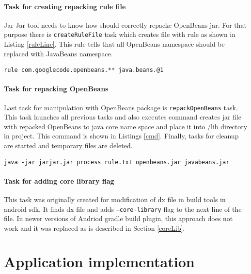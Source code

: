 \paragraph{Task for creating repacking rule file}  Jar Jar tool needs to know how should correctly repacke OpenBeans jar.
For that purpose there is \texttt{createRuleFile} task which creates file with rule as shown in Listing \ref{ruleLine}.
This rule tells that all OpenBeans namespace should be replaced with JavaBeans namespace.
\\
\begin{lstlisting}[captionpos={b},caption={Jar Jar Links rule for repacking OpenBeans to Java core namespace},frame={lines},label={ruleLine},basicstyle=\footnotesize]
rule com.googlecode.openbeans.** java.beans.@1
\end{lstlisting}

\paragraph{Task for repacking OpenBeans}
Last task for manipulation with OpenBeans package is \texttt{repackOpenBeans} task. This task launches all previous tasks
and also executes command creates jar file with repacked OpenBeans to java core name space and place it into /lib directory
in project. This command is shown in Listings \ref{cmd}. Finally, tasks for cleanup are started and temporary files
are deleted.
\\
\begin{lstlisting}[captionpos={b},caption={Command for repacking openbeans.jar file},frame={lines},label={cmd},basicstyle=\footnotesize]
java -jar jarjar.jar process rule.txt openbeans.jar javabeans.jar
\end{lstlisting}

\paragraph{Task for adding core library flag}
This task was originally created for modification of dx file in build tools in android sdk. It finds dx file and adds
\texttt{--core-library} flag to the next line of the file. In newer versions of Andriod gradle build plugin, this
approach does not work and it was replaced as is described in Section \ref{coreLib}.

\section{Application implementation}

